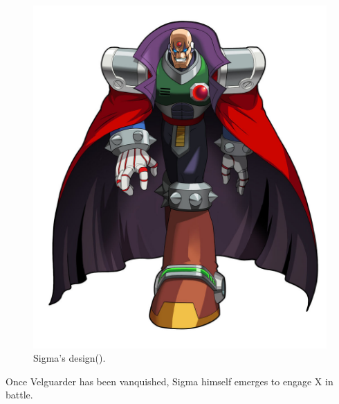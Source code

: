 \begin{figure}[htp]
	\includegraphics[height=\portraitsize]{figures/X1/Sigma_stages/MHXSigma.jpg}
	\caption{Sigma's design(\cite{book:MMX_Complete_art}).}
\end{figure}
Once Velguarder has been vanquished, Sigma himself emerges to engage X in battle.

